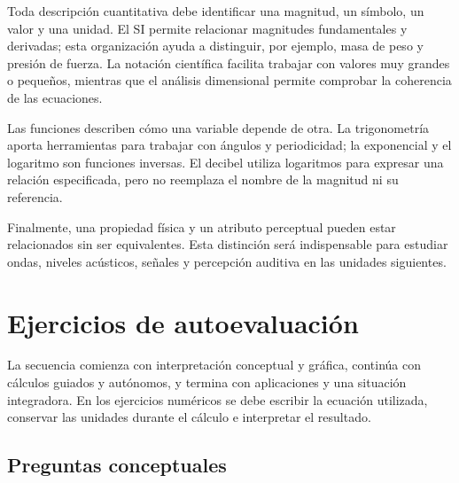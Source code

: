 Toda descripción cuantitativa debe identificar una magnitud, un símbolo, un valor y una unidad. El SI permite relacionar magnitudes fundamentales y derivadas; esta organización ayuda a distinguir, por ejemplo, masa de peso y presión de fuerza. La notación científica facilita trabajar con valores muy grandes o pequeños, mientras que el análisis dimensional permite comprobar la coherencia de las ecuaciones.

Las funciones describen cómo una variable depende de otra. La trigonometría aporta herramientas para trabajar con ángulos y periodicidad; la exponencial y el logaritmo son funciones inversas. El decibel utiliza logaritmos para expresar una relación especificada, pero no reemplaza el nombre de la magnitud ni su referencia.

Finalmente, una propiedad física y un atributo perceptual pueden estar relacionados sin ser equivalentes. Esta distinción será indispensable para estudiar ondas, niveles acústicos, señales y percepción auditiva en las unidades siguientes.

\section{Ejercicios de autoevaluación}
\label{sec:u1-ejercicios}

La secuencia comienza con interpretación conceptual y gráfica, continúa con cálculos guiados y autónomos, y termina con aplicaciones y una situación integradora. En los ejercicios numéricos se debe escribir la ecuación utilizada, conservar las unidades durante el cálculo e interpretar el resultado.

\subsection*{Preguntas conceptuales}

